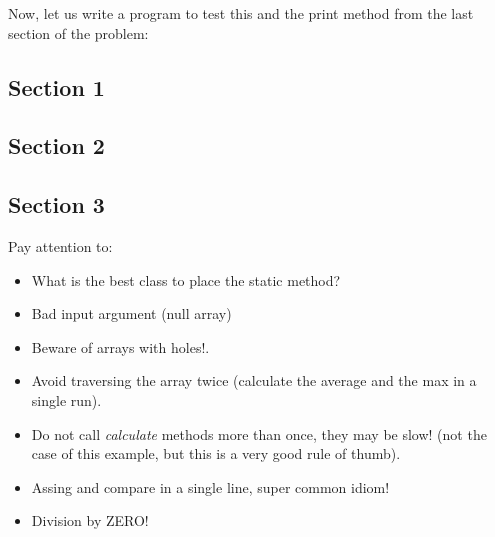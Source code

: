 \documentclass[a4paper, 9pt]{extarticle}
\begin{document}
Now, let us write a program to test this and the print method from the last section of the problem:



\newpage

\subsection{Section 1}



\subsection{Section 2}



\newpage

\subsection{Section 3}

\begin{multicols}{2}
Pay attention to:

\begin{itemize}

  \item What is the best class to place the static method?

  \item Bad input argument (null array)

  \item Beware of arrays with holes!.

  \item Avoid traversing the array twice (calculate the average and
    the max in a single run).

  \item Do not call \emph{calculate} methods more than once, they may be slow!
    (not the case of this example, but this is a very good rule of thumb).

  \item Assing and compare in a single line, super common idiom!

  \item Division by ZERO!

\end{itemize}
\columnbreak
{}
\end{multicols}
\end{document}
